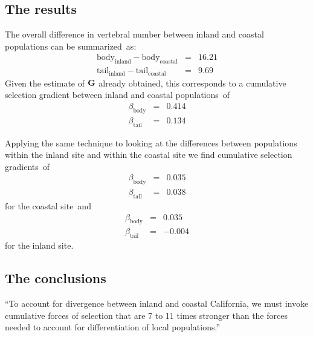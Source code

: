 \subsection*{The results}

The overall difference in vertebral number between inland and coastal
populations can be summarized~as:
\begin{eqnarray*}
\mbox{body}_{\mbox{inland}} - \mbox{body}_{\mbox{coastal}} &=& 16.21 \\
\mbox{tail}_{\mbox{inland}} - \mbox{tail}_{\mbox{coastal}} &=& 9.69
\end{eqnarray*}
Given the estimate of $\bf G$ already obtained, this corresponds to a
cumulative selection gradient between inland and coastal
populations~of
\begin{eqnarray*}
\beta_{\mbox{body}} &=& 0.414 \\
\beta_{\mbox{tail}} &=& 0.134
\end{eqnarray*}

Applying the same technique to looking at the differences between
populations within the inland site and within the coastal site we find
cumulative selection gradients~of
\begin{eqnarray*}
\beta_{\mbox{body}} &=& 0.035 \\
\beta_{\mbox{tail}} &=& 0.038
\end{eqnarray*}
for the coastal site~and
\begin{eqnarray*}
\beta_{\mbox{body}} &=& 0.035 \\
\beta_{\mbox{tail}} &=& -0.004
\end{eqnarray*}
for the inland site.

\subsection*{The conclusions}

``To account for divergence between inland and coastal California, we
must invoke cumulative forces of selection that are 7 to 11 times
stronger than the forces needed to account for differentiation of
local populations.''

